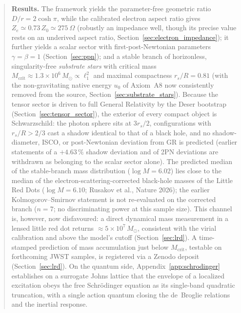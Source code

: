 \documentclass[11pt,a4paper]{article}
\theoremstyle{plain}
\theoremstyle{remark}
\begin{document}
\begin{abstract}
\noindent\textbf{Results.} The framework yields the parameter-free geometric ratio $D/r = 2\cosh\pi$, while the calibrated electron aspect ratio gives $Z_e \simeq 0.73\,Z_0 \simeq 275~\Omega$ (robustly an impedance well, though its precise value rests on an underived aspect ratio, Section~\ref{sec:electron_impedance}); it further yields a scalar sector with first-post-Newtonian parameters $\gamma = \beta = 1$ (Section~\ref{sec:ppn}); and a stable branch of horizonless, singularity-free \emph{substrate stars} with critical mass $M_{\text{crit}} \approx 1.3\times10^{6}\,M_\odot \propto \ell_1^2$ and maximal compactness $r_s/R = 0.81$ (with the non-gravitating native energy $u_0$ of Axiom~A8 now consistently removed from the source, Section~\ref{sec:substrate_stars}). Because the tensor sector is driven to full General Relativity by the Deser bootstrap (Section~\ref{sec:tensor_sector}), the exterior of every compact object is Schwarzschild: the photon sphere sits at $3r_s/2$, configurations with $r_s/R > 2/3$ cast a shadow identical to that of a black hole, and no shadow-diameter, ISCO, or post-Newtonian deviation from GR is predicted (earlier statements of a $+4.63\,\%$ shadow deviation and of 2PN deviations are withdrawn as belonging to the scalar sector alone). The predicted median of the stable-branch mass distribution ($\log M = 6.02$) lies close to the median of the electron-scattering-corrected black-hole masses of the Little Red Dots ($\log M = 6.10$; Rusakov et al., Nature 2026); the earlier Kolmogorov--Smirnov statement is not re-evaluated on the corrected branch ($n = 7$; no discriminating power at this sample size). This channel is, however, now disfavoured: a direct dynamical mass measurement in a lensed little red dot returns $\approx 5\times10^{7}\,M_\odot$, consistent with the virial calibration and above the model's cutoff (Section~\ref{sec:lrd}). A time-stamped prediction of mass accumulation just below $M_{\text{crit}}$, testable on forthcoming JWST samples, is registered via a Zenodo deposit (Section~\ref{sec:lrd}). On the quantum side, Appendix~\ref{app:schrodinger} establishes on a surrogate Johns lattice that the envelope of a localized excitation obeys the free Schr\"odinger equation as its single-band quadratic truncation, with a single action quantum closing the de~Broglie relations and the inertial response.


\end{abstract}
\end{document}
